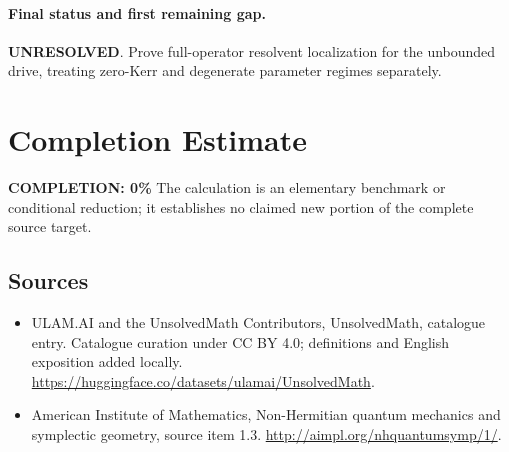 \documentclass[11pt]{article}
\begin{document}
\paragraph{Final status and first remaining gap.}
\textbf{UNRESOLVED}. Prove full-operator resolvent localization for the unbounded drive, treating zero-Kerr and degenerate parameter regimes separately.

\section{Completion Estimate}
\noindent\textbf{COMPLETION: 0\%}
The calculation is an elementary benchmark or conditional reduction; it establishes no claimed new portion of the complete source target.

\subsection{Sources}
\begin{itemize}
\item[\hypertarget{source:statement:1}{S1}] ULAM.AI and the UnsolvedMath Contributors, UnsolvedMath, catalogue entry. Catalogue curation under CC BY 4.0; definitions and English exposition added locally.
\url{https://huggingface.co/datasets/ulamai/UnsolvedMath}.
\item[\hypertarget{source:statement:2}{S2}] American Institute of Mathematics, Non-Hermitian quantum mechanics and symplectic geometry, source item 1.3.
\url{http://aimpl.org/nhquantumsymp/1/}.
\end{itemize}
\label{end:statement}
\end{document}
